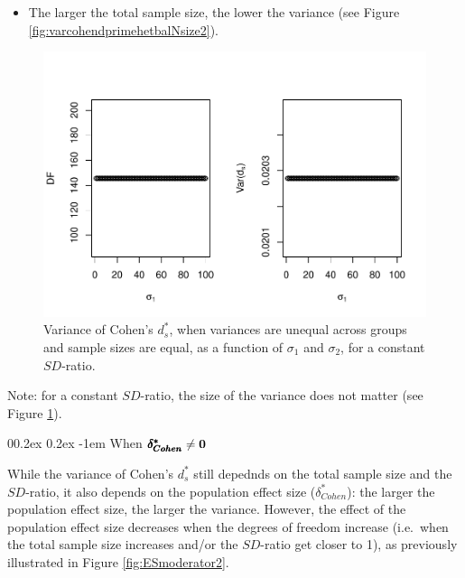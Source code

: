 \documentclass[
  english,
  man,mask]{apa6}
\makeatletter
\providecommand{\tightlist}{%
  \setlength{\itemsep}{0pt}\setlength{\parskip}{0pt}}
\let\oldparagraph\paragraph
\renewcommand{\paragraph}[1]{\oldparagraph{#1}\mbox{}}
\renewcommand{\paragraph}{\@startsection{paragraph}{4}{\parindent}%
  {0\baselineskip \@plus 0.2ex \@minus 0.2ex}%
  {-1em}%
  {\normalfont\normalsize\bfseries\itshape\typesectitle}}
\makeatother
\begin{document}
\begin{itemize}
\tightlist
\item
  The larger the total sample size, the lower the variance (see Figure \ref{fig:varcohendprimehetbalNsize2}).
\end{itemize}

\begin{figure}
\centering
\includegraphics{Theoretical-Variance-of-all-estimators-as-a-function-of-population-parameters_files/figure-latex/varcohendprimehetbalvariance2-1.pdf}
\caption{\label{fig:varcohendprimehetbalvariance2}Variance of Cohen's \(d^*_s\), when variances are unequal across groups and sample sizes are equal, as a function of \(\sigma_1\) and \(\sigma_2\), for a constant \(SD\)-ratio.}
\end{figure}

Note: for a constant \(SD\)-ratio, the size of the variance does not matter (see Figure \ref{fig:varcohendprimehetbalvariance2}).

\hypertarget{when-bf-pmbdelta_cohen-neq-0-2}{%
\paragraph{\texorpdfstring{When \(\bf \pmb{\delta^*_{Cohen}} \neq 0\)}{When \textbackslash bf \textbackslash pmb\{\textbackslash delta\^{}*\_\{Cohen\}\} \textbackslash neq 0}}\label{when-bf-pmbdelta_cohen-neq-0-2}}

While the variance of Cohen's \(d^*_s\) still depednds on the total sample size and the \(SD\)-ratio, it also depends on the population effect size (\(\delta^*_{Cohen}\)): the larger the population effect size, the larger the variance. However, the effect of the population effect size decreases when the degrees of freedom increase (i.e.~when the total sample size increases and/or the \(SD\)-ratio get closer to 1), as previously illustrated in Figure \ref{fig:ESmoderator2}.
\end{document}
